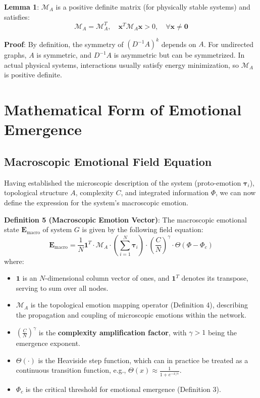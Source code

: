\documentclass[12pt,a4paper]{article}
\theoremstyle{plain}
\newcommand{\ve}[1]{\bm{#1}}                    %
\newcommand{\Evec}{\ve{E}}                        %
\begin{document}
\textbf{Lemma 1}: $\mathcal{M}_A$ is a positive definite matrix (for physically stable systems) and satisfies:
\begin{equation}
\mathcal{M}_A = \mathcal{M}_A^T, \quad \mathbf{x}^T \mathcal{M}_A \mathbf{x} > 0, \quad \forall \mathbf{x} \neq \mathbf{0}
\end{equation}

\textbf{Proof}: By definition, the symmetry of $(D^{-1}A)^k$ depends on $A$. For undirected graphs, $A$ is symmetric, and $D^{-1}A$ is asymmetric but can be symmetrized. In actual physical systems, interactions usually satisfy energy minimization, so $\mathcal{M}_A$ is positive definite.

\section{Mathematical Form of Emotional Emergence}

\subsection{Macroscopic Emotional Field Equation}

Having established the microscopic description of the system (proto-emotion $\ve{\tau}_i$), topological structure $A$, complexity $C$, and integrated information $\Phi$, we can now define the expression for the system's macroscopic emotion.

\textbf{Definition 5 (Macroscopic Emotion Vector)}: The macroscopic emotional state $\Evec_{\text{macro}}$ of system $G$ is given by the following field equation:
\begin{equation}
\Evec_{\text{macro}} = \frac{1}{N} \mathbf{1}^T \cdot \mathcal{M}_A \cdot \left( \sum_{i=1}^N \ve{\tau}_i \right) \cdot \left( \frac{C}{N} \right)^\gamma \cdot \Theta(\Phi - \Phi_c)
\label{eq:macro_emotion}
\end{equation}
where:
\begin{itemize}
    \item $\mathbf{1}$ is an $N$-dimensional column vector of ones, and $\mathbf{1}^T$ denotes its transpose, serving to sum over all nodes.
    \item $\mathcal{M}_A$ is the topological emotion mapping operator (Definition 4), describing the propagation and coupling of microscopic emotions within the network.
    \item $\left( \frac{C}{N} \right)^\gamma$ is the \textbf{complexity amplification factor}, with $\gamma > 1$ being the emergence exponent.
    \item $\Theta(\cdot)$ is the Heaviside step function, which can in practice be treated as a continuous transition function, e.g., $\Theta(x) \approx \frac{1}{1+e^{-x/\epsilon}}$.
    \item $\Phi_c$ is the critical threshold for emotional emergence (Definition 3).
\end{itemize}
\end{document}
